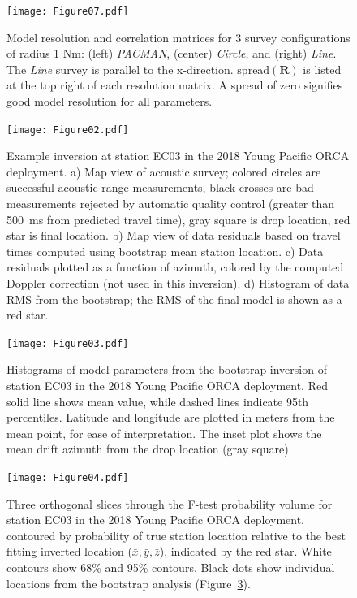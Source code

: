 \newpage

\begin{figure}[h]
\texttt{[image: Figure07.pdf]}
\caption{ Model resolution and correlation matrices for 3 survey configurations of radius 1 Nm: (left) \textit{PACMAN}, (center) \textit{Circle}, and (right) \textit{Line}. The \textit{Line} survey is parallel to the x-direction. $\text{spread}(\mathbf{R})$ is listed at the top right of each resolution matrix. A spread of zero signifies good model resolution for all parameters.}
\label{fig:resolution_correlation}
\end{figure}

\newpage

\begin{figure}[h]
\texttt{[image: Figure02.pdf]}
\caption{Example inversion at station EC03 in the 2018 Young Pacific ORCA deployment. a) Map view of acoustic survey; colored circles are successful acoustic range measurements, black crosses are bad measurements rejected by automatic quality control (greater than 500~ms from predicted travel time), gray square is drop location, red star is final location. b) Map view of data residuals based on travel times computed using bootstrap mean station location. c) Data residuals plotted as a function of azimuth, colored by the computed Doppler correction (not used in this inversion). d) Histogram of data RMS from the bootstrap; the RMS of the final model is shown as a red star.}
\label{fig:one_sta_real_survey}
\end{figure}

\newpage

\begin{figure}[h]
\texttt{[image: Figure03.pdf]}
\caption{Histograms of model parameters from the bootstrap inversion of station EC03 in the 2018 Young Pacific ORCA deployment. Red solid line shows mean value, while dashed lines indicate 95th percentiles. Latitude and longitude are plotted in meters from the mean point, for ease of interpretation. The inset plot shows the mean drift azimuth from the drop location (gray square).}
\label{fig:one_sta_real_histograms}
\end{figure}

\newpage

\begin{figure}[h]
\texttt{[image: Figure04.pdf]}
\caption{ Three orthogonal slices through the F-test probability volume for station EC03 in the 2018 Young Pacific ORCA deployment, contoured by probability of true station location relative to the best fitting inverted location ($\bar{x},\bar{y},\bar{z}$), indicated by the red star. White contours show 68\% and 95\% contours. Black dots show individual locations from the bootstrap analysis (Figure~\ref{fig:one_sta_real_histograms}).}
\label{fig:one_sta_real_ftests}
\end{figure}

